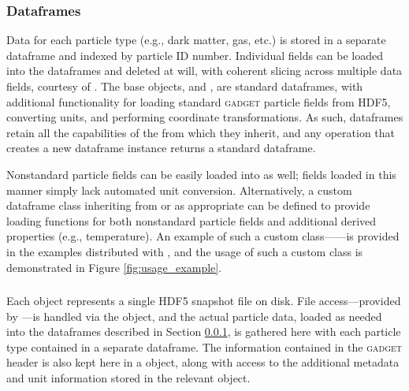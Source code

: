 \subsubsection{ Dataframes}
\label{sec:df}
Data for each particle type (e.g., dark matter, gas, etc.) is stored in a separate  dataframe and indexed by particle ID number. 
Individual fields can be loaded into the dataframes and deleted at will, with coherent slicing across multiple data fields, courtesy of .  
The base  objects,  and , are standard  dataframes, with additional functionality for loading standard \textsc{gadget} particle fields from HDF5, converting units, and performing coordinate transformations.  
As such,  dataframes retain all the capabilities of the  from which they inherit, and any operation that creates a new dataframe instance returns a standard  dataframe.

Nonstandard particle fields can be easily loaded into  as well; fields loaded in this manner simply lack automated unit conversion.
Alternatively, a custom dataframe class inheriting from  or  as appropriate can be defined to provide loading functions for both nonstandard particle fields and additional derived properties (e.g., temperature). An example of such a custom class------is provided in the examples distributed with , and the usage of such a custom class is demonstrated in Figure \ref{fig:usage_example}.

\subsubsection{}
\label{sec:snap}
Each  object represents a single HDF5 snapshot file on disk.  File access---provided by ---is handled via the  object, and the actual particle data, loaded as needed into the  dataframes described in Section \ref{sec:df}, is gathered here with each particle type contained in a separate  dataframe.  
The information contained in the \textsc{gadget} header is also kept here in a  object, along with access to the additional metadata and unit information stored in the relevant  object.

